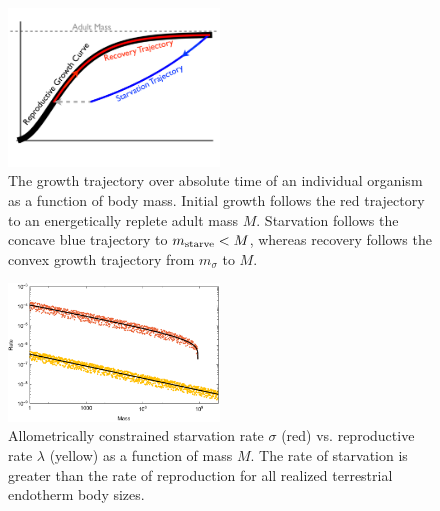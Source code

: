 \documentclass{pnastwo}
\begin{document}
\begin{figure}
\centering
\includegraphics[width=0.5\textwidth]{Growth-trajectory-diagram.pdf}
\caption{
The growth trajectory over absolute time of an individual organism as a function of body mass.
Initial growth follows the red trajectory to an energetically replete adult mass $M$.
Starvation follows the concave blue trajectory to $m_{\rm starve} < M$, whereas recovery follows the convex growth trajectory from $m_\sigma$ to $M$.
}
\label{fig:growth}
\end{figure}

\begin{figure}
\centering
\includegraphics[width=0.5\textwidth]{fig_GvS.pdf}
\caption{
Allometrically constrained starvation rate $\sigma$ (red) vs. reproductive rate $\lambda$ (yellow) as a function of mass $M$.
The rate of starvation is greater than the rate of reproduction for all realized terrestrial endotherm body sizes.
}
\label{fig:gvs}
\end{figure}
\end{document}
